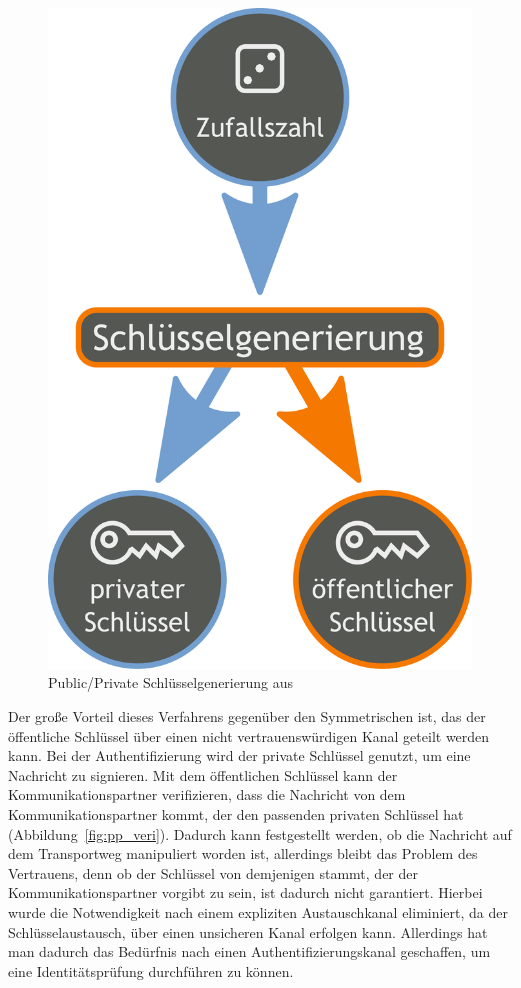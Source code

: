 \documentclass[11pt,a4paper]{report}
\begin{document}
\begin{figure}[htbp]
\centering
\includegraphics[scale=0.2]{images/public_private_keygeneration.pdf}
\caption{Public/Private Schlüsselgenerierung aus \cite{wiki_asym_crypto}}
\label{fig:pp_keygen}
\end{figure}

Der große Vorteil dieses Verfahrens gegenüber den Symmetrischen ist, das der öffentliche Schlüssel über einen nicht vertrauenswürdigen Kanal geteilt werden kann. Bei der Authentifizierung wird der private Schlüssel genutzt, um eine Nachricht zu signieren. Mit dem öffentlichen Schlüssel kann der Kommunikationspartner verifizieren, dass die Nachricht von dem Kommunikationspartner kommt, der den passenden privaten Schlüssel hat (Abbildung~\ref{fig:pp_veri}). Dadurch kann festgestellt werden, ob die Nachricht auf dem Transportweg manipuliert worden ist, allerdings bleibt das Problem des Vertrauens, denn ob der Schlüssel von demjenigen stammt, der der Kommunikationspartner vorgibt zu sein, ist dadurch nicht garantiert. Hierbei wurde die Notwendigkeit nach einem expliziten Austauschkanal eliminiert, da der Schlüsselaustausch, über einen unsicheren Kanal erfolgen kann. Allerdings hat man dadurch das Bedürfnis nach einen Authentifizierungskanal geschaffen, um eine Identitätsprüfung durchführen zu können.
 
\end{document}
